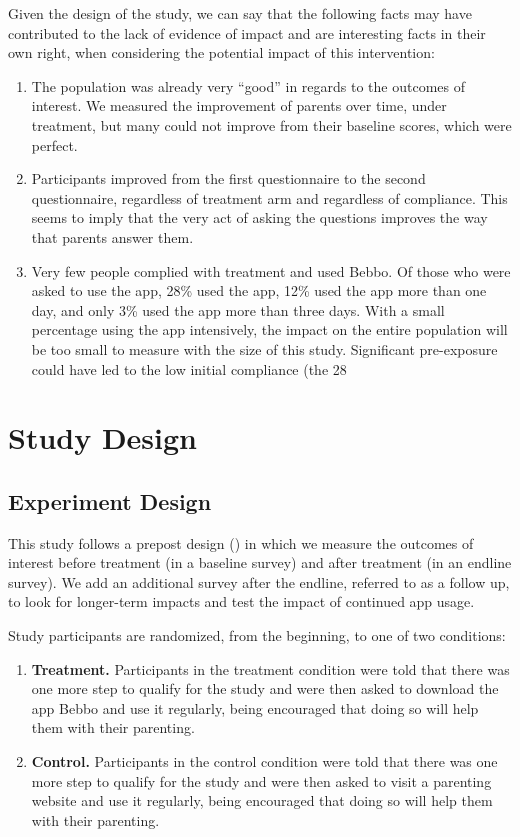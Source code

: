 \documentclass{article}
\begin{document}
Given the design of the study, we can say that the following facts may have contributed to the lack of evidence of impact and are interesting facts in their own right, when considering the potential impact of this intervention:


\begin{enumerate}
\item The population was already very “good” in regards to the outcomes of interest. We measured the improvement of parents over time, under treatment, but many could not improve from their baseline scores, which were perfect.
\item Participants improved from the first questionnaire to the second questionnaire, regardless of treatment arm and regardless of compliance. This seems to imply that the very act of asking the questions improves the way that parents answer them.
\item Very few people complied with treatment and used Bebbo. Of those who were asked to use the app, 28\% used the app, 12\% used the app more than one day, and only 3\% used the app more than three days. With a small percentage using the app intensively, the impact on the entire population will be too small to measure with the size of this study. Significant pre-exposure could have led to the low initial compliance (the 28%
\end{enumerate}


\clearpage

\section{Study Design}

\subsection*{Experiment Design}

This study follows a prepost design (\cite{Clifford2021}) in which we measure the outcomes of interest before treatment (in a baseline survey) and after treatment (in an endline survey). We add an additional survey after the endline, referred to as a follow up, to look for longer-term impacts and test the impact of continued app usage.

Study participants are randomized, from the beginning, to one of two conditions:

\begin{enumerate}
\item \textbf{Treatment.} Participants in the treatment condition were told that there was one more step to qualify for the study and were then asked to download the app Bebbo and use it regularly, being encouraged that doing so will help them with their parenting.
\item \textbf{Control.} Participants in the control condition were told that there was one more step to qualify for the study and were then asked to visit a parenting website and use it regularly, being encouraged that doing so will help them with their parenting.
\end{enumerate}
\end{document}
